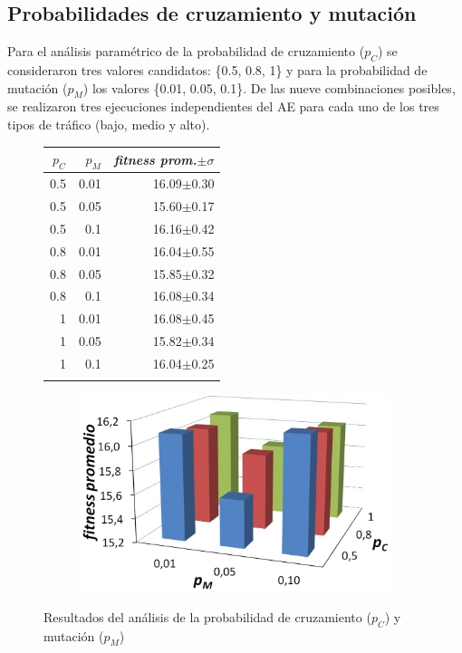 \subsection{Probabilidades de cruzamiento y mutación}
Para el análisis paramétrico de la probabilidad de cruzamiento ($p_C$) se consideraron tres valores candidatos: \{0.5, 0.8, 1\} y para la probabilidad de mutación ($p_M$) los valores \{0.01,  0.05,  0.1\}. De las nueve combinaciones posibles, se realizaron tres ejecuciones independientes del AE para cada uno de los tres tipos de tráfico (bajo, medio y alto).  

\begin{figure}[H]
\begin{minipage}[t]{0.4\linewidth}
\begin{table}[H]
	\renewcommand{\arraystretch}{1.0}
\renewcommand{\tabcolsep}{4pt}
	\centering
	\begin{tabular}{rrr}
		\toprule
		$p_C$&
		$p_M$ &
		\textit{fitness prom.$\pm \sigma$}\\
		\midrule
		0.5 & 0.01  &  16.09$\pm$0.30\\
		0.5 & 0.05 &  15.60$\pm$0.17\\
		0.5 & 0.1  &  16.16$\pm$0.42\\
		0.8 & 0.01  &  16.04$\pm$0.55\\
		0.8 & 0.05  &  15.85$\pm$0.32\\
		0.8 & 0.1  &  16.08$\pm$0.34\\
		1 & 0.01 &  16.08$\pm$0.45\\
		1 & 0.05 &  15.82$\pm$0.34\\
		1 & 0.1 &  16.04$\pm$0.25\\
		\bottomrule
\\[-9pt]
	\end{tabular}
\end{table}
\end{minipage}
\begin{minipage}[t]{0.6\linewidth}
\begin{figure}[H]
	\centering
	\includegraphics[width=1.0\linewidth]{Figures/grafica_mutacion_cruzamiento}
	\label{fig:grafica_mutacion_cruzamiento}
\end{figure}
\end{minipage}
	\caption{Resultados 
del análisis de la probabilidad de cruzamiento ($p_C$) y mutación ($p_M$)}
	\label{table:parametro_mutacion_cruzamiento}
\end{figure}
 
